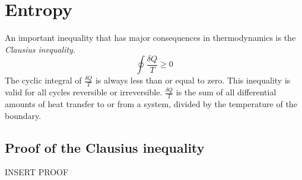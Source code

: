 \documentclass[class=report, crop=false, 12pt,a4paper]{standalone}
\numberwithin{equation}{section}
\begin{document}
\section{Entropy}
An important inequality that has major consequences in thermodynamics is the \emph{Clausius inequality}.
\begin{equation}
  \oint \frac{\delta Q}{T} \geq 0 
\end{equation}
The cyclic integral of \( \frac{\delta Q}{T} \) is always less than or equal to zero. This inequality is valid for all cycles reversible or irreversible. \( \frac{\delta Q}{T} \) is the sum of all differential amounts of heat transfer to or from a system, divided by the temperature of the boundary.
\subsection{Proof of the Clausius inequality}
INSERT PROOF
\end{document}
